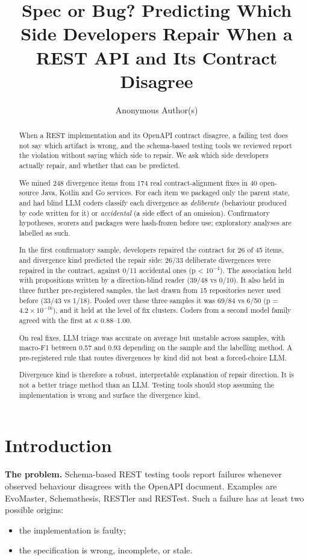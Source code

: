 \documentclass[acmsmall,screen,review,anonymous]{acmart}
\begin{document}
\title{Spec or Bug? Predicting Which Side Developers Repair When a REST API and Its Contract Disagree}
\author{Anonymous Author(s)}
\begin{abstract}
When a REST implementation and its OpenAPI contract disagree, a failing test does not say which artifact is wrong, and the schema-based testing tools we reviewed report the violation without saying which side to repair. We ask which side developers actually repair, and whether that can be predicted.

We mined 248 divergence items from 174 real contract-alignment fixes in 40 open-source Java, Kotlin and Go services. For each item we packaged only the parent state, and had blind LLM coders classify each divergence as \emph{deliberate} (behaviour produced by code written for it) or \emph{accidental} (a side effect of an omission). Confirmatory hypotheses, scorers and packages were hash-frozen before use; exploratory analyses are labelled as such.

In the first confirmatory sample, developers repaired the contract for 26 of 45 items, and divergence kind predicted the repair side: 26/33 deliberate divergences were repaired in the contract, against 0/11 accidental ones (p \textless{} $10^{-4}$). The association held with propositions written by a direction-blind reader (39/48 vs 0/10). It also held in three further pre-registered samples, the last drawn from 15 repositories never used before (33/43 vs 1/18). Pooled over these three samples it was 69/84 vs 6/50 (p = $4.2 \times 10^{-16}$), and it held at the level of fix clusters. Coders from a second model family agreed with the first at $\kappa$ 0.88--1.00.

On real fixes, LLM triage was accurate on average but unstable across samples, with macro-F1 between 0.57 and 0.93 depending on the sample and the labelling method. A pre-registered rule that routes divergences by kind did not beat a forced-choice LLM.

Divergence kind is therefore a robust, interpretable explanation of repair direction. It is not a better triage method than an LLM. Testing tools should stop assuming the implementation is wrong and surface the divergence kind.
\end{abstract}
\maketitle

\section{Introduction}
\textbf{The problem.} Schema-based REST testing tools report failures whenever observed behaviour disagrees with the OpenAPI document. Examples are EvoMaster, Schemathesis, RESTler and RESTest. Such a failure has at least two possible origins:
\begin{itemize}
\item the implementation is faulty;
\item the specification is wrong, incomplete, or stale.
\end{itemize}
\end{document}
